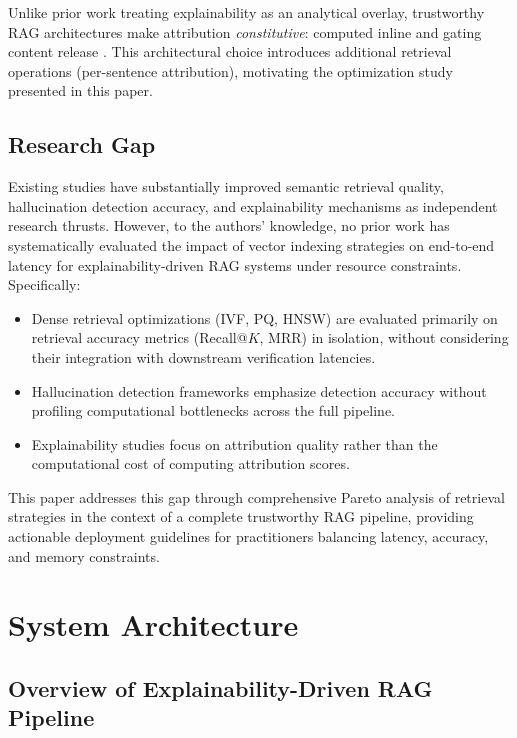 \documentclass[conference]{IEEEtran}
\begin{document}
Unlike prior work treating explainability as an analytical overlay, trustworthy RAG architectures make attribution \emph{constitutive}: computed inline and gating content release \cite{krainovskikh2026domain}. This architectural choice introduces additional retrieval operations (per-sentence attribution), motivating the optimization study presented in this paper.

\subsection{Research Gap}

Existing studies have substantially improved semantic retrieval quality, hallucination detection accuracy, and explainability mechanisms as independent research thrusts. However, to the authors' knowledge, no prior work has systematically evaluated the impact of vector indexing strategies on end-to-end latency for explainability-driven RAG systems under resource constraints. Specifically:

\begin{itemize}
    \item Dense retrieval optimizations (IVF, PQ, HNSW) are evaluated primarily on retrieval accuracy metrics (Recall@$K$, MRR) in isolation, without considering their integration with downstream verification latencies.
    \item Hallucination detection frameworks emphasize detection accuracy without profiling computational bottlenecks across the full pipeline.
    \item Explainability studies focus on attribution quality rather than the computational cost of computing attribution scores.
\end{itemize}

This paper addresses this gap through comprehensive Pareto analysis of retrieval strategies in the context of a complete trustworthy RAG pipeline, providing actionable deployment guidelines for practitioners balancing latency, accuracy, and memory constraints.

\section{System Architecture}

\subsection{Overview of Explainability-Driven RAG Pipeline}
\end{document}
